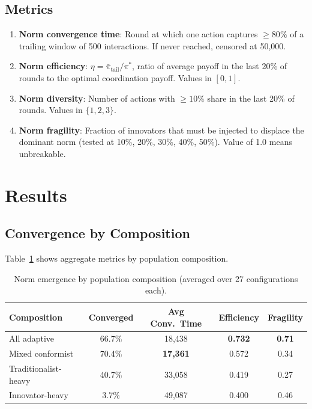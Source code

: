 \documentclass[11pt]{article}
\begin{document}
\subsection{Metrics}
\begin{enumerate}
  \item \textbf{Norm convergence time}: Round at which one action captures $\geq 80\%$ of a trailing window of 500 interactions. If never reached, censored at 50,000.
  \item \textbf{Norm efficiency}: $\eta = \bar{\pi}_{\text{tail}} / \pi^*$, ratio of average payoff in the last 20\% of rounds to the optimal coordination payoff. Values in $[0, 1]$.
  \item \textbf{Norm diversity}: Number of actions with $\geq 10\%$ share in the last 20\% of rounds. Values in $\{1, 2, 3\}$.
  \item \textbf{Norm fragility}: Fraction of innovators that must be injected to displace the dominant norm (tested at 10\%, 20\%, 30\%, 40\%, 50\%). Value of 1.0 means unbreakable.
\end{enumerate}

\section{Results}

\subsection{Convergence by Composition}

Table~\ref{tab:composition} shows aggregate metrics by population composition.

\begin{table}[h]
\centering
\small
\caption{Norm emergence by population composition (averaged over 27 configurations each).}
\label{tab:composition}
\begin{tabular}{lcccc}
\toprule
\textbf{Composition} & \textbf{Converged} & \textbf{Avg Conv.\ Time} & \textbf{Efficiency} & \textbf{Fragility} \\
\midrule
All adaptive       & 66.7\% & 18,438 & \textbf{0.732} & \textbf{0.71} \\
Mixed conformist   & 70.4\% & \textbf{17,361} & 0.572 & 0.34 \\
Traditionalist-heavy & 40.7\% & 33,058 & 0.419 & 0.27 \\
Innovator-heavy    & 3.7\%  & 49,087 & 0.400 & 0.46 \\
\bottomrule
\end{tabular}
\end{table}
\end{document}
